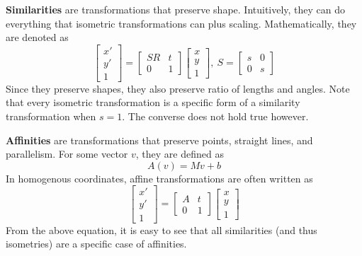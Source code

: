 \documentclass[a4paper, 12pt]{article}
\renewcommand\emph{\textbf}
\begin{document}
\emph{Similarities} are transformations that preserve shape. Intuitively, they can do everything that isometric transformations can plus scaling. Mathematically, they are denoted as 
\begin{equation*}
    \begin{bmatrix}x'\\y'\\1\end{bmatrix} = \begin{bmatrix}SR & t\\ 0 & 1\end{bmatrix}\begin{bmatrix}x\\y\\1\end{bmatrix},\ S = \begin{bmatrix}s & 0\\ 0 & s\end{bmatrix}
\end{equation*}
Since they preserve shapes, they also preserve ratio of lengths and angles. Note that every isometric transformation is a specific form of a similarity transformation when $s=1$. The converse does not hold true however.

\emph{Affinities} are transformations that preserve points, straight lines, and parallelism. For some vector $v$, they are defined as 
\begin{equation*}
    A(v) = Mv + b
\end{equation*}
In homogenous coordinates, affine transformations are often written as
\begin{equation*}
    \begin{bmatrix}x'\\y'\\1\end{bmatrix} = \begin{bmatrix}A & t\\ 0 & 1\end{bmatrix}\begin{bmatrix}x\\y\\1\end{bmatrix}
\end{equation*}
From the above equation, it is easy to see that all similarities (and thus isometries) are a specific case of affinities.
\end{document}
